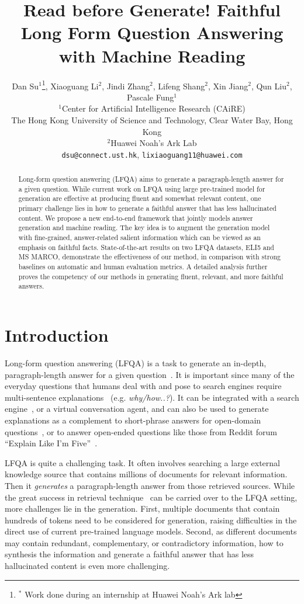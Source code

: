 \documentclass[11pt]{article}
\title{Read before Generate! Faithful Long Form Question Answering with Machine Reading}
\author{Dan Su$^1$\thanks{$^*$ Work done during an internship at Huawei Noah's Ark lab}, Xiaoguang Li$^2$, Jindi Zhang$^2$, Lifeng Shang$^2$, Xin Jiang$^2$, Qun Liu$^2$, Pascale Fung$^1$ \\
$^1$Center for Artificial Intelligence Research (CAiRE)\protect\\
  The Hong Kong University of Science and Technology, Clear Water Bay, Hong Kong\\
$^2$Huawei Noah’s Ark Lab \\
\texttt{dsu@connect.ust.hk}, \texttt{lixiaoguang11@huawei.com}
}
\date{}
\begin{document}
\maketitle
\begin{abstract}
Long-form question answering (LFQA) aims to generate a paragraph-length answer for a given question. While current work on LFQA using large pre-trained model for generation are effective at producing fluent and somewhat relevant content, one primary challenge lies in how to generate a faithful answer that has less hallucinated content. We propose a new end-to-end framework that jointly models answer generation and machine reading. The key idea is to augment the generation model with fine-grained, answer-related salient information which can be viewed as an emphasis on faithful facts. State-of-the-art results on two LFQA datasets, ELI5 and MS MARCO, demonstrate the effectiveness of our method, in comparison with strong baselines on automatic and human evaluation metrics. A detailed analysis further proves the competency of our methods in generating fluent, relevant, and more faithful answers.




\end{abstract}

\section{Introduction}

Long-form question answering (LFQA) is a task to generate an in-depth, paragraph-length answer for a given question~\cite{fan2019eli5}. It is important since many of the everyday questions that humans deal with and pose to search engines require multi-sentence explanations~\cite{khashabi2021gooaq} (e.g. \textit{why/how..?}). It can be integrated with a search engine~\cite{metzler2021rethinking}, or a virtual conversation agent, and can also be used to generate explanations as a complement to short-phrase answers for open-domain questions~\cite{kwiatkowski2019natural, yang2018HotpotQA}, or to answer open-ended questions like those from Reddit forum “Explain Like I’m Five”~\cite{fan2019eli5}.




LFQA is quite a challenging task. It often involves searching a large external knowledge source that contains millions of documents for relevant information. Then it \textit{generates} a paragraph-length answer from those retrieved sources. While the great success in retrieval technique~\cite{guu2020realm, karpukhin2020dense, lee2019latent} can be carried over to the LFQA setting, more challenges lie in the generation. First, multiple documents that contain hundreds of tokens need to be considered for generation, raising difficulties in the direct use of current pre-trained language models. Second, as different documents may contain redundant, complementary, or contradictory information, how to synthesis the information and generate a faithful answer that has less hallucinated content is even more challenging.
\end{document}
